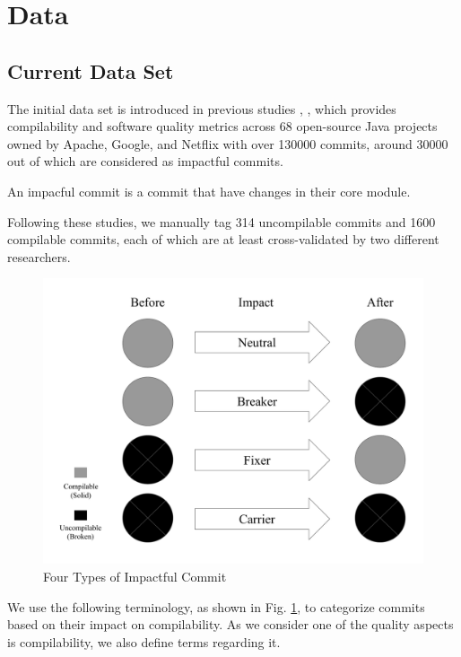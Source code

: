 \section{Data}
\subsection{Current Data Set}
\label{sec:data}

The initial data set is introduced in previous studies \cite{pooyan_esem}, \cite{pooyan_qrs}, which provides compilability and software quality metrics across 68 open-source Java projects owned by Apache, Google, and Netflix with over 130000 commits, around 30000 out of which are considered as impactful commits. 

An impacful commit is a commit that have changes in their core module.

Following these studies, we manually tag 314 uncompilable commits and 1600 compilable commits, each of which are at least cross-validated by two different researchers.

\begin{figure}[htbp]
    \centerline{\includegraphics[scale=0.3]{figures/terminology.pdf}}
    \caption{Four Types of Impactful Commit}
    \label{fig:terminology}
    \end{figure}

We use the following terminology, as shown in Fig. \ref{fig:terminology}, to categorize commits based on their impact on compilability. 
As we consider one of the quality aspects is compilability, we also define terms regarding it.

